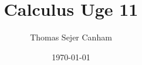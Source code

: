 \documentclass{article}
\title{Calculus Uge 11}
\author{Thomas Sejer Canham}
\date{\today}
\begin{document}
\begin{titlepage}
 \maketitle
 \thispagestyle{empty}
\end{titlepage}
\end{document}
